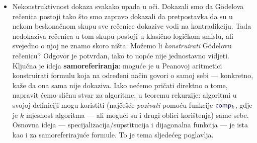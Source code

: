 \begin{itemize}
    \item Nekonstruktivnost dokaza svakako upada u oči. Dokazali smo da G\"odelova rečenica postoji tako što smo zapravo dokazali da pretpostavka da su u nekom beskonačnom skupu sve rečenice dokazive vodi na kontradikciju. Tada nedokaziva rečenica u tom skupu postoji u klasično-logičkom smislu, ali svejedno o njoj ne znamo skoro ništa. Možemo li \emph{konstruirati} G\"odelovu rečenicu? Odgovor je potvrdan, iako to uopće nije jednostavno vidjeti. Ključna je ideja \textbf{samoreferiranja}: moguće je u Peanovoj aritmetici konstruirati formulu koja na određeni način govori o samoj sebi --- konkretno, kaže da ona sama nije dokaziva. Iako nećemo pričati direktno o tome, napravit ćemo sličnu stvar za algoritme, u teoremu rekurzije: algoritmi u svojoj definiciji mogu koristiti (najčešće \emph{pozivati} pomoću funkcije $\f{comp}_k$, gdje je $k$ mjesnost algoritma --- ali mogući su i drugi oblici korištenja) same sebe. Osnovna ideja --- specijalizacija\slash supstitucija i dijagonalna funkcija --- je ista kao i za samoreferirajuće formule. To je tema sljedećeg poglavlja.
\end{itemize}
